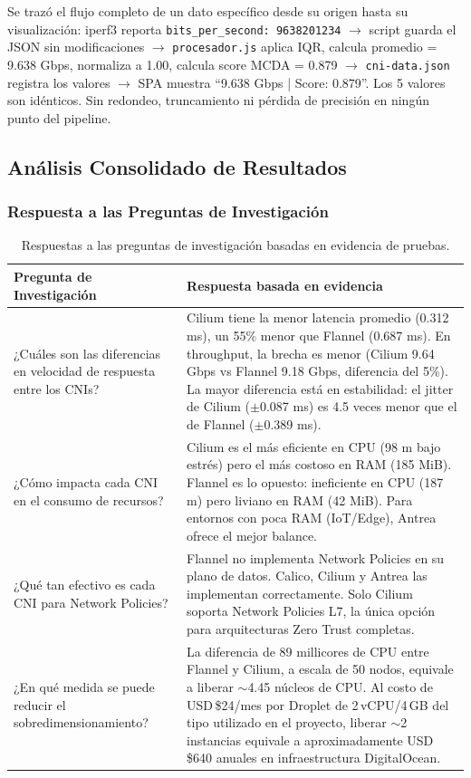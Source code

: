 Se trazó el flujo completo de un dato específico desde su origen hasta su visualización: iperf3 reporta \texttt{bits\_per\_second: 9638201234} $\rightarrow$ script guarda el JSON sin modificaciones $\rightarrow$ \texttt{procesador.js} aplica IQR, calcula promedio = 9.638 Gbps, normaliza a 1.00, calcula score MCDA = 0.879 $\rightarrow$ \texttt{cni-data.json} registra los valores $\rightarrow$ SPA muestra ``9.638 Gbps | Score: 0.879''. Los 5 valores son idénticos. Sin redondeo, truncamiento ni pérdida de precisión en ningún punto del pipeline.

\subsection{Análisis Consolidado de Resultados}

\subsubsection{Respuesta a las Preguntas de Investigación}

\begin{table}[htbp]
\centering
\scriptsize
\begin{tabularx}{\textwidth}{|Y|Y|}
\hline
\textbf{Pregunta de Investigación} & \textbf{Respuesta basada en evidencia} \\
\hline
¿Cuáles son las diferencias en velocidad de respuesta entre los CNIs? & Cilium tiene la menor latencia promedio (0.312 ms), un 55\% menor que Flannel (0.687 ms). En throughput, la brecha es menor (Cilium 9.64 Gbps vs Flannel 9.18 Gbps, diferencia del 5\%). La mayor diferencia está en estabilidad: el jitter de Cilium ($\pm$0.087 ms) es 4.5 veces menor que el de Flannel ($\pm$0.389 ms). \\
¿Cómo impacta cada CNI en el consumo de recursos? & Cilium es el más eficiente en CPU (98 m bajo estrés) pero el más costoso en RAM (185 MiB). Flannel es lo opuesto: ineficiente en CPU (187 m) pero liviano en RAM (42 MiB). Para entornos con poca RAM (IoT/Edge), Antrea ofrece el mejor balance. \\
¿Qué tan efectivo es cada CNI para Network Policies? & Flannel no implementa Network Policies en su plano de datos. Calico, Cilium y Antrea las implementan correctamente. Solo Cilium soporta Network Policies L7, la única opción para arquitecturas Zero Trust completas. \\
¿En qué medida se puede reducir el sobredimensionamiento? & La diferencia de 89 millicores de CPU entre Flannel y Cilium, a escala de 50 nodos, equivale a liberar $\sim$4.45 núcleos de CPU. Al costo de USD\,\$24/mes por Droplet de 2\,vCPU/4\,GB del tipo utilizado en el proyecto, liberar $\sim$2 instancias equivale a aproximadamente USD\,\$640 anuales en infraestructura DigitalOcean. \\
\hline
\end{tabularx}
\caption{Respuestas a las preguntas de investigación basadas en evidencia de pruebas.}
\end{table}

